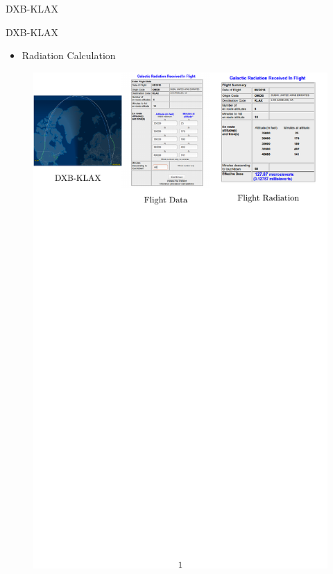 \documentclass[aspectratio=1610]{beamer}
\newcommand{\semitransp}[2][35]{\color{fg!#1}#2}
\begin{document}
\begin{frame}{DXB-KLAX}

\begin{block}{DXB-KLAX}
\end{block}
\begin{itemize}
\item Radiation Calculation

\end{itemize}
\vspace{-0.5cm}
\begin{figure}[]

   \includegraphics[scale=1.1]{images/DXB-TO-KLAX.pdf}   
 \end{figure} 
\end{frame}
\end{document}

